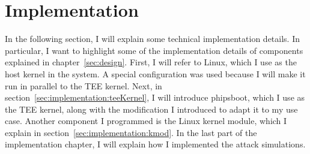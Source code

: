 \chapter{Implementation}
\label{sec:implementation}


In the following section, I will explain some technical implementation details.
In particular, I want to highlight some of the implementation details of
components explained in chapter~\ref{sec:design}. First, I will refer to Linux,
which I use as the host kernel in the system. A special configuration was used
because I will make it run in parallel to the TEE kernel. Next, in
section~\ref{sec:implementation:teeKernel}, I will introduce phipsboot, which I
use as the TEE kernel, along with the modification I introduced to adapt it to
my use case. Another component I programmed is the Linux kernel module, which I
explain in section~\ref{sec:implementation:kmod}. In the last part of the
implementation chapter, I will explain how I implemented the attack simulations.

